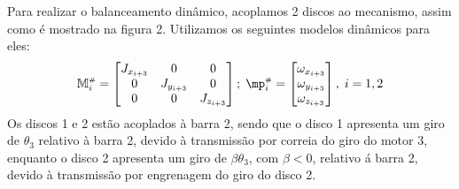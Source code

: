 \documentclass[a4paper,11pt,brazil,fleqn]{article}
\begin{document}
Para realizar o balanceamento din\^{a}mico, acoplamos 2 discos ao mecanismo, assim como \'{e} mostrado na figura 2. Utilizamos os seguintes modelos din\^{a}micos para eles:
\begin{equation}\label{eq:DiscsModel2}
\mM\ssh_i = \begin{bmatrix} J_{x_{i+3}} & 0 & 0 \\ 0 & J_{y_{i+3}} & 0 \\ 0 & 0 & J_{z_{i+3}} \end{bmatrix}; \; \mp\ssh_i = \begin{bmatrix} \omega_{x_{i+3}} \\ \omega_{y_{i+3}} \\ \omega_{z_{i+3}} \end{bmatrix}, \; i = 1, 2
\end{equation}
Os discos 1 e 2 est\~{a}o acoplados \`{a} barra 2, sendo que o disco 1 apresenta um giro de $\theta_3$ relativo \`{a} barra 2, devido \`{a} transmiss\~{a}o por correia do giro do motor 3, enquanto o disco 2 apresenta um giro de $\beta\theta_3$, com $\beta < 0$, relativo \'{a} barra 2, devido \`{a} transmiss\~{a}o por engrenagem do giro do disco 2.
\end{document}
